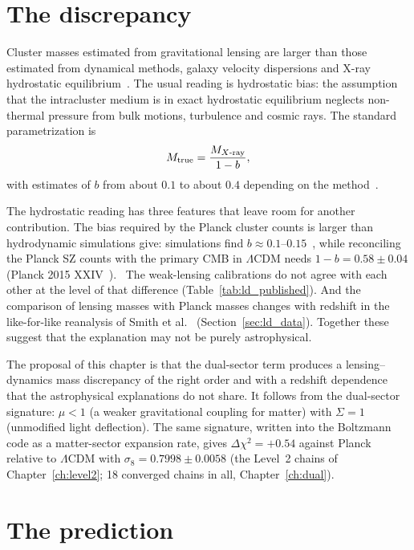 \section{The discrepancy}\label{sec:ld_intro}
Cluster masses estimated from gravitational lensing are larger than those estimated from dynamical methods, galaxy velocity dispersions and X-ray
hydrostatic equilibrium~\cite{Mahdavi2013,Israel2014,Hoekstra2015,vonderLinden2014,Smith2016LoCuSS}. The usual reading is hydrostatic bias: the
assumption that the intracluster medium is in exact hydrostatic equilibrium neglects non-thermal pressure from bulk motions, turbulence and cosmic
rays. The standard parametrization is
\begin{equation}
M_{\rm true}=\frac{M_{X\text{-ray}}}{1-b},
\label{eq:ld_b}\end{equation}
with estimates of $b$ from about $0.1$ to about $0.4$ depending on the method~\cite{Nagai2007ICM,Rasia2012,Biffi2016}. \observed

The hydrostatic reading has three features that leave room for another contribution. The bias required by the Planck cluster counts is larger than
hydrodynamic simulations give: simulations find $b\approx0.1$--$0.15$~\cite{Lau2009,Nelson2014}, while reconciling the Planck SZ counts with the
primary CMB in $\Lambda$CDM needs $1-b=0.58\pm0.04$ (Planck 2015 XXIV~\cite{Planck2015SZ}). \observed\ The weak-lensing calibrations do not agree with
each other at the level of that difference (Table~\ref{tab:ld_published}). And the comparison of lensing masses with Planck masses changes with
redshift in the like-for-like reanalysis of Smith et al.~\cite{Smith2016LoCuSS} (Section~\ref{sec:ld_data}). Together these suggest that the
explanation may not be purely astrophysical. \interp

The proposal of this chapter is that the dual-sector term produces a lensing--dynamics mass discrepancy of the right order and with a redshift
dependence that the astrophysical explanations do not share. It follows from the dual-sector signature: $\mu<1$ (a weaker gravitational coupling for
matter) with $\Sigma=1$ (unmodified light deflection). The same signature, written into the Boltzmann code as a matter-sector expansion rate, gives
$\Delta\chi^2=+0.54$ against Planck relative to $\Lambda$CDM with $\sigma_8=0.7998\pm0.0058$ (the Level~2 chains of Chapter~\ref{ch:level2}; 18
converged chains in all, Chapter~\ref{ch:dual}). \measured

\section{The prediction}\label{sec:ld_prediction}
